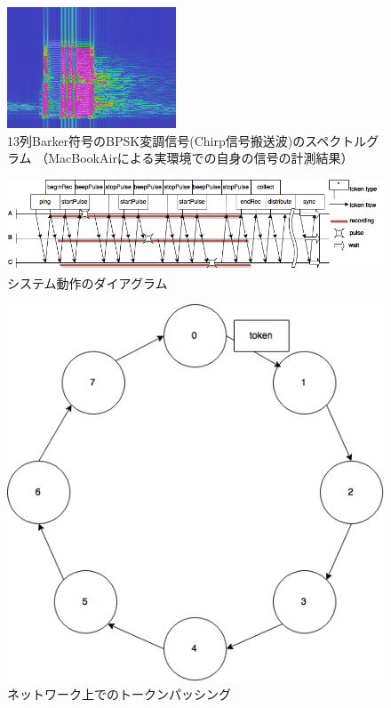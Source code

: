 \begin{figure}[pb]\centering
\includegraphics[clip,width=0.75\hsize]{img/barker_coded_chirp_err.png}
\caption{13列Barker符号のBPSK変調信号(Chirp信号搬送波)のスペクトルグラム
（MacBookAirによる実環境での自身の信号の計測結果）}\label{fig:barker_coded_chirp_err}
\end{figure}


\begin{figure}[pb]\centering
\includegraphics[clip,width=0.85\hsize]{img/flowchart.png}
\caption{システム動作のダイアグラム}\label{fig:pulsediagram}
\end{figure}

\begin{figure}[pb]\centering
\includegraphics[clip,width=0.85\hsize]{img/chord_ring_network.png}
\caption{ネットワーク上でのトークンパッシング}\label{fig:scheduling}
\end{figure}


